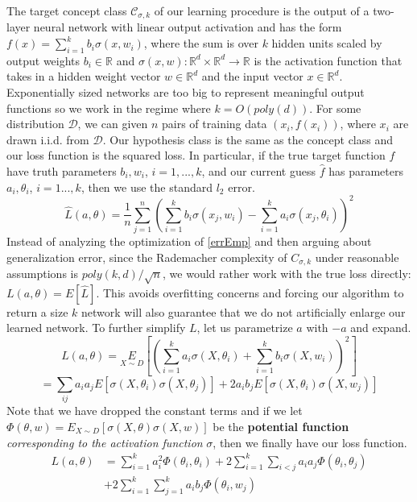 \documentclass{article}
\newcommand{\R}{{\mathbb{R}}}
\begin{document}
The target concept class $\mathcal{C}_{\sigma,k}$ of our learning procedure is the output of a two-layer neural network with linear output activation and has the form $f(x) = \sum_{i=1}^k b_i\sigma(x,w_i)$, where the sum is over $k$ hidden units scaled by output weights $b_i \in \R$ and $\sigma(x,w):\R^d \times \R^d\to \R$ is the activation function that takes in a hidden weight vector $w \in \R^d$ and the input vector $x \in \R^d$. Exponentially sized networks are too big to represent meaningful output functions so we work in the regime where $k = O(poly(d))$. For some distribution $\mathcal{D}$, we can given $n$ pairs of training data $(x_i, f(x_i))$, where $x_i$ are drawn i.i.d. from $\mathcal{D}$. Our hypothesis class is the same as the concept class and our loss function is the squared loss. In particular, if the true target function $f$ have truth parameters $b_i, w_i$, $i = 1,...,k$, and our current guess $\widehat{f}$ has parameters $a_i, \theta_i$, $i=1...,k$, then we use the standard $l_2$ error.
\begin{equation}\label{errEmp}
\widehat{L}(a,\theta)  = \frac{1}{n}\sum_{j=1}^n \left(\sum_{i=1}^k b_i\sigma(x_j,w_i) - \sum_{i=1}^k a_i \sigma(x_j,\theta_i)\right)^2
\end{equation}
Instead of analyzing the optimization of \eqref{errEmp} and then arguing about generalization error, since the Rademacher complexity of $C_{\sigma, k}$ under reasonable assumptions is  $poly(k, d)/\sqrt{n}$, we would rather work with the true loss directly: $L(a,\theta) = {E}[\widehat{L}]$. This avoids overfitting concerns and forcing our algorithm to return a size $k$ network will also guarantee that we do not artificially enlarge our learned network. To further simplify $L$, let us parametrize $a$ with $-a$ and expand.
\begin{equation*}
L(a,\theta)  = \underset{X\sim D}{E}\left[ \left(  \sum_{i=1}^k a_i \sigma(X,\theta_i) + \sum_{i=1}^k b_i\sigma(X,w_i)\right)^2\right]
\end{equation*}
\begin{equation*}
= \sum_{ij} a_i a_j E[\sigma(X,\theta_i)\sigma(X,\theta_j)]  + 2 a_ib_j E[\sigma(X,\theta_i)\sigma(X,w_j)] 
\end{equation*}
Note that we have dropped the constant terms and if we let $\Phi(\theta, w) = E_{X\sim D}[ \sigma(X,\theta) \sigma(X,w)]$ be the {\bf potential function} {\it corresponding to the activation function} $\sigma$, then we finally have our loss function.
\begin{equation}\label{errLoss}
\begin{split}
L(a,\theta) &= \sum_{i=1}^k a_i^2 \Phi(\theta_i,\theta_i) + 2\sum_{i=1}^k\sum_{i < j} a_i a_j \Phi(\theta_i,\theta_j) \\
&+ 2\sum_{i=1}^k\sum_{j=1}^k a_ib_j \Phi(\theta_i,w_j)
\end{split}
\end{equation}
\end{document}
